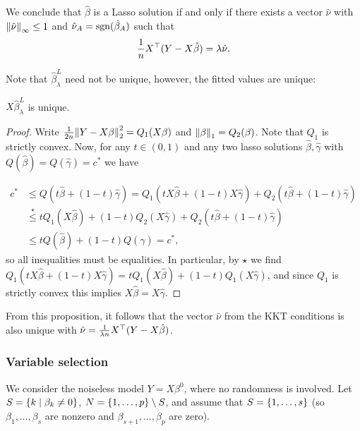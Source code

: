 We conclude that $\hat\beta$ is a Lasso solution if and only if there exists a vector $\hat\nu$ with $\norm{\hat\nu}_{\infty} \leq 1$ and $\hat\nu_A = \operatorname{sgn}(\hat\beta_A)$ such that
\[
\frac1n X^\top(Y - X\hat\beta) = \lambda \hat\nu. 
\]

Note that $\hat\beta^L_\lambda$ need not be unique, however, the fitted values are unique:
\begin{proposition}
	$X\hat\beta_\lambda^L$ is unique. 
\end{proposition}

\begin{proof}
	Write $\frac1{2n}\norm{Y- X\beta}_2^2 = Q_1(X \beta)$ and $\norm{\beta}_1 = Q_2(\beta)$. Note that $Q_1$ is strictly convex. Now, for any $t\in (0, 1)$ and any two lasso solutions $\hat\beta, \hat\gamma$ with $Q(\hat\beta) = Q(\hat\gamma) = c^*$ we have
	
	\begin{align*}
		c^* &\leq Q(t\hat\beta + (1-t)\hat\gamma) = Q_1(tX\hat\beta+(1-t)X\hat\gamma) + Q_2(t\hat\beta + (1-t)\hat\gamma) \\
		&\overset\star\leq t Q_1(X\hat\beta) + (1-t)Q_2(X\hat\gamma) + Q_2(t\hat\beta + (1-t)\hat\gamma) \\
		&\leq t Q(\hat\beta) + (1-t)Q(\hat\gamma) = c^*,
	\end{align*}
so all inequalities must be equalities. In particular, by $\star$ we find $Q_1(tX\hat\beta + (1-t)X\hat\gamma) = t Q_1(X\hat\beta) + (1-t)Q_1(X\hat\gamma)$, and since $Q_1$ is strictly convex this implies $X\hat\beta = X\hat\gamma$. 
\end{proof}

From this proposition, it follows that the vector $\hat\nu$ from the KKT conditions is also unique with $\hat\nu = \frac1{\lambda n} X^\top (Y - X\hat\beta)$. 
\subsubsection{Variable selection}
We consider the noiseless model $Y = X\beta^0$, where no randomness is involved. Let $S = \qty{k \mid \beta_k \neq 0}$, $N = \qty{1, \dotsc, p} \setminus S$, and assume that $S = \qty{1, \dotsc, s}$ (so $\beta_1, \dotsc, \beta_s$ are nonzero and $\beta_{s+1}, \dotsc, \beta_p$ are zero). 

